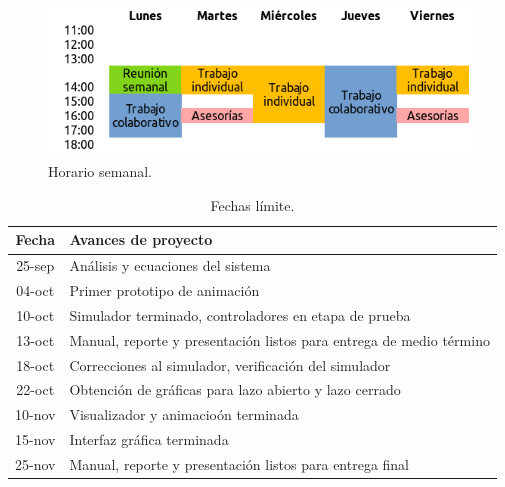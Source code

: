 \begin{figure}
 \centering
 \includegraphics[scale=0.6]{img/horario.png}
 \caption{Horario semanal.}
 \label{fig: horario}
\end{figure}

\begin{table}[hb!]
\centering 
\begin{tabular}{c|l} 
\label{table: calendar} 
Fecha & Avances de proyecto\\ 
\hline 
25-sep & An\'alisis y ecuaciones del sistema\\
04-oct & Primer prototipo de animaci\'on\\
10-oct & Simulador terminado, controladores en etapa de 
prueba\\
13-oct & Manual, reporte y presentaci\'on listos para 
entrega de medio t\'ermino\\
18-oct & Correcciones al simulador, verificaci\'on del 
simulador\\
22-oct & Obtenci\'on de gr\'aficas para lazo abierto y 
lazo cerrado\\
10-nov & Visualizador y animacio\'on terminada\\
15-nov & Interfaz gr\'afica terminada\\
25-nov & Manual, reporte y presentaci\'on listos para 
entrega final\\

\hline 
\end{tabular} 
\caption{Fechas l\'imite.} 
\end{table}
